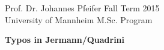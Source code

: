 \documentclass[11pt,a4paper]{article}
\begin{document}
\noindent Prof. Dr. Johannes Pfeifer \hfill Fall Term 2015\\
University of Mannheim \hfill M.Sc. Program
\vspace{0.4cm}

\begin{center}
\textbf{\Large{Typos in Jermann/Quadrini}}\\
\vspace{0.4cm}
\end{center}

\end{document}
